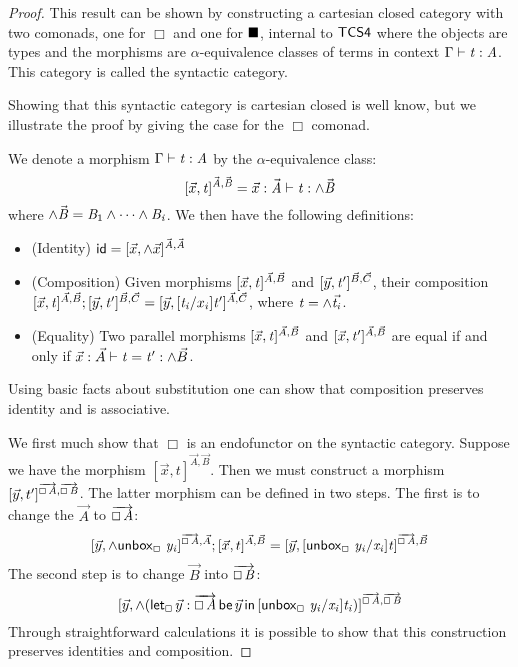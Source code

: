 \begin{proof}
  This result can be shown by constructing a cartesian closed category
  with two comonads, one for $\Box$ and one for $\blacksquare$, internal to
  $\sf{TCS4}$ where the objects are types and the morphisms are
  $\alpha$-equivalence classes of terms in context $\Gamma  \vdash  \mathit{t}  :  \mathit{A}$.
  This category is called the syntactic category.

  Showing that this syntactic category is cartesian closed is well
  know, but we illustrate the proof by giving the case for the $\Box$
  comonad.

  We denote a morphism $\Gamma  \vdash  \mathit{t}  :  \mathit{A}$ by the $\alpha$-equivalence
  class:
  \[
  [\vec{x},\mathit{t} ]^{\vec{\mathit{A}},\vec{\mathit{B}}} = \vec{x}:\vec{\mathit{A}} \vdash \mathit{t} : \wedge\vec{\mathit{B}}
  \]
  where $\wedge\vec{\mathit{B}} = \mathit{B_{{\mathrm{1}}}} \wedge \cdots \wedge \mathit{B_{\mathit{i}}}$.  We
  then have the following definitions:
  \begin{itemize}
  \item (Identity) $\mathsf{id} = [\vec{x},\wedge\vec{x}]^{\vec{\mathit{A}},\vec{\mathit{A}}}$
  \item (Composition) Given morphisms $[\vec{x},\mathit{t} ]^{\vec{A},\vec{B}}$ and
    $[\vec{y},\mathit{t'} ]^{\vec{B},\vec{C}}$, their composition
    $[\vec{x},\mathit{t} ]^{\vec{A},\vec{B}};[\vec{y},\mathit{t'} ]^{\vec{B},\vec{C}} =
    [\vec{y},[ \mathit{t_{\mathit{i}}} / x_i ] \mathit{t'} ]^{\vec{A},\vec{C}}$, where
    $\mathit{t} = \wedge\vec{\mathit{t_{\mathit{i}}}}$.
  \item (Equality) Two parallel morphisms $[\vec{x},\mathit{t}
  ]^{\vec{A},\vec{B}}$ and $[\vec{x},\mathit{t'} ]^{\vec{A},\vec{B}}$ are
    equal if and only if
    $\vec{x} : \vec{A} \vdash \mathit{t} = \mathit{t'} : \wedge\vec{B}$.
  \end{itemize}
  Using basic facts about substitution one can show that composition
  preserves identity and is associative.

  We first much show that $\Box$ is an endofunctor on the syntactic
  category.  Suppose we have the morphism
  $[\vec{x},t]^{\vec{A},\vec{B}}$.  Then we must construct a morphism
  $[\vec{y},t']^{\overrightarrow{\oblong \, \mathit{A}},\overrightarrow{\oblong \, \mathit{B}}}$.  The latter morphism can be defined in two steps.
  The first is to change the $\vec{A}$ to $\overrightarrow{\oblong \, \mathit{A}}$:
  \[
    [ \vec{y},\wedge \mathsf{unbox}_\oblong\, \, \mathit{y_{\mathit{i}}} ]^{\overrightarrow{\oblong \, \mathit{A}},\vec{A}};[\vec{x},t]^{\vec{A},\vec{B}}
    = [\vec{y}, [ \mathsf{unbox}_\oblong\, \, \mathit{y_{\mathit{i}}}/\mathit{x_{\mathit{i}}} ] \mathit{t} ]^{\overrightarrow{\oblong \, \mathit{A}},\vec{B}}
    \]
    The second step is to change $\vec{B}$ into $\overrightarrow{\oblong \, \mathit{B}}$:
    \[
      [\vec{y},\wedge (\mathsf{let}_\oblong\,\vec{y}:\overrightarrow{\oblong \, \mathit{A}}\,\mathsf{be}\,\vec{y}\,\mathsf{in}\,[ \mathsf{unbox}_\oblong\, \, \mathit{y_{\mathit{i}}}/\mathit{x_{\mathit{i}}} ]\mathit{t_{\mathit{i}}})]^{\overrightarrow{\oblong \, \mathit{A}},\overrightarrow{\oblong \, \mathit{B}}}
      \]
  Through straightforward calculations it is possible to show that
  this construction preserves identities and composition.


\end{proof}
